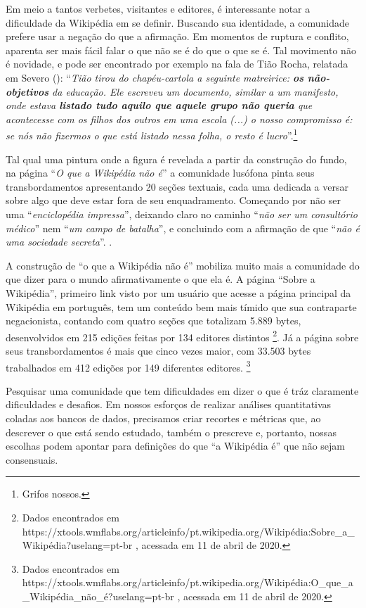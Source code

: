 Em meio a tantos verbetes, visitantes e editores, é interessante notar a dificuldade da Wikipédia em se definir. Buscando sua identidade, a comunidade prefere usar a negação do que a afirmação. Em momentos de ruptura e conflito, aparenta ser mais fácil falar o que não se é do que o que se é. Tal movimento não é novidade, e pode ser encontrado por exemplo na fala de Tião Rocha, relatada em Severo (\citeyear[p. 19-20]{severo_tics_2016}): ``\textit{Tião tirou do chapéu-cartola a seguinte matreirice: \textbf{os não-objetivos} da educação. Ele escreveu um documento, similar a um manifesto, onde estava \textbf{listado tudo aquilo que aquele grupo não queria} que acontecesse com os filhos dos outros em uma escola (...) o nosso compromisso é: se nós não fizermos o que está listado nessa folha, o resto é lucro}''.\footnote{Grifos nossos.}

Tal qual uma pintura onde a figura é revelada a partir da construção do fundo, na página ``\textit{O que a Wikipédia não é}'' a comunidade lusófona pinta seus transbordamentos apresentando 20 seções textuais, cada uma dedicada a versar sobre algo que deve estar fora de seu enquadramento. Começando por não ser uma ``\textit{enciclopédia impressa}'', deixando claro no caminho ``\textit{não ser um consultório médico}'' nem ``\textit{um campo de batalha}'', e concluindo com a afirmação de que ``\textit{não é uma sociedade secreta}''. .

A construção de ``o que a Wikipédia não é'' mobiliza muito mais a comunidade do que dizer para o mundo afirmativamente o que ela é. A página “Sobre a Wikipédia”, primeiro link visto por um usuário que acesse a página principal da Wikipédia em português, tem um conteúdo bem mais tímido que sua contraparte negacionista,  contando com quatro seções que totalizam 5.889 bytes, desenvolvidos em 215 edições feitas por 134 editores distintos 
\footnote{Dados encontrados em https://xtools.wmflabs.org/articleinfo/pt.wikipedia.org/Wikipédia:Sobre\_a\_Wikipédia?uselang=pt-br , acessada em 11 de abril de 2020.}. Já a página sobre seus transbordamentos é mais que cinco vezes maior, com 33.503 bytes trabalhados em 412 edições por 149 diferentes editores. 
\footnote{Dados encontrados em https://xtools.wmflabs.org/articleinfo/pt.wikipedia.org/Wikipédia:O\_que\_a\_Wikipédia\_não\_é?uselang=pt-br , acessada em 11 de abril de 2020.} 

Pesquisar uma comunidade que tem dificuldades em dizer o que é tráz claramente dificuldades e desafios. Em nossos esforços de realizar análises quantitativas coladas aos bancos de dados, precisamos criar recortes e métricas que, ao descrever o que está sendo estudado, também o prescreve e, portanto, nossas escolhas podem apontar para definições do que ``a Wikipédia é'' que não sejam consensuais.

